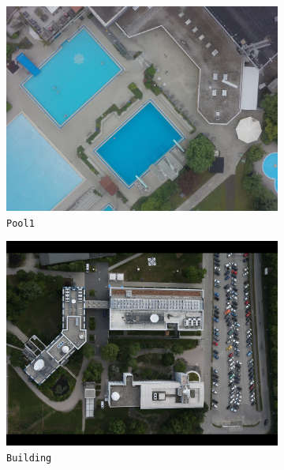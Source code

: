 \begin{figure}[tbp]
\begin{subfigure}[b]{0.243\textwidth}
           \includegraphics[width=\textwidth]{figures_dataset/swimmingpool_org_uav.jpg}
           \caption{\texttt{Pool1}}
       \end{subfigure}
       \hfill
       \begin{subfigure}[b]{0.243\textwidth}   
           \centering 
           \includegraphics[width=\textwidth]{figures_dataset/eoc_new_org_air.JPG}
           \caption{\texttt{Building}}
       \end{subfigure}
       \begin{subfigure}[b]{0.243\textwidth}  
           \centering 

\end{subfigure}
\end{figure}
